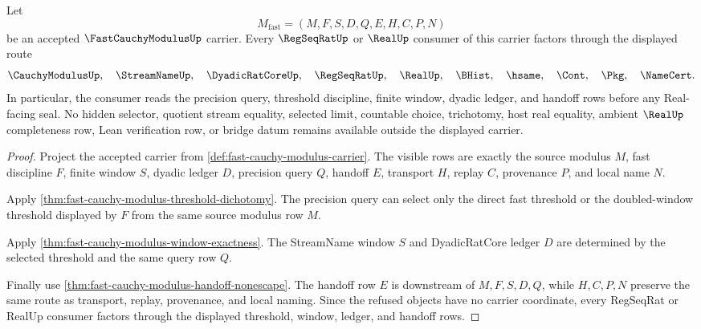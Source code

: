 \begin{theorem}
\label{thm:fast-cauchy-modulus-consumer-factorization}
Let
$$
M_{\mathrm{fast}}=(M,F,S,D,Q,E,H,C,P,N)
$$
be an accepted $\FastCauchyModulusUp$ carrier. Every $\RegSeqRatUp$ or $\RealUp$ consumer of this carrier factors through the displayed route
$$
\CauchyModulusUp,\quad \StreamNameUp,\quad \DyadicRatCoreUp,\quad \RegSeqRatUp,\quad \RealUp,\quad \BHist,\quad \hsame,\quad \Cont,\quad \Pkg,\quad \NameCert .
$$
In particular, the consumer reads the precision query, threshold discipline, finite window, dyadic ledger, and handoff rows before any Real-facing seal. No hidden selector, quotient stream equality, selected limit, countable choice, trichotomy, host real equality, ambient $\RealUp$ completeness row, Lean verification row, or bridge datum remains available outside the displayed carrier.
\end{theorem}
\begin{proof}
Project the accepted carrier from \autoref{def:fast-cauchy-modulus-carrier}. The visible rows are exactly the source modulus $M$, fast discipline $F$, finite window $S$, dyadic ledger $D$, precision query $Q$, handoff $E$, transport $H$, replay $C$, provenance $P$, and local name $N$.

Apply \autoref{thm:fast-cauchy-modulus-threshold-dichotomy}. The precision query can select only the direct fast threshold or the doubled-window threshold displayed by $F$ from the same source modulus row $M$.

Apply \autoref{thm:fast-cauchy-modulus-window-exactness}. The StreamName window $S$ and DyadicRatCore ledger $D$ are determined by the selected threshold and the same query row $Q$.

Finally use \autoref{thm:fast-cauchy-modulus-handoff-nonescape}. The handoff row $E$ is downstream of $M,F,S,D,Q$, while $H,C,P,N$ preserve the same route as transport, replay, provenance, and local naming. Since the refused objects have no carrier coordinate, every RegSeqRat or RealUp consumer factors through the displayed threshold, window, ledger, and handoff rows.
\end{proof}


